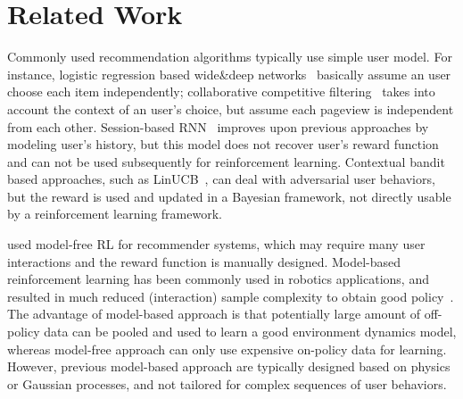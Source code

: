 \documentclass{article} %
\newcommand{\xc}[1]{{\color{blue}{\bf\sf [#1]}}}
\begin{document}


\vspace{-3mm}
\section{Related Work}
\vspace{-3mm}

Commonly used recommendation algorithms typically use simple user model. For instance, logistic regression based wide\&deep networks~\citep{ChengKocHarmsen16} basically assume an user choose each item independently; collaborative competitive filtering~\citep{YanLonSmoEtal11b} takes into account the context of an user's choice, but assume each pageview is independent from each other.
Session-based RNN~\citep{HidKarBalTik16} improves upon previous approaches by modeling user's history, but this model does not recover user's reward function and can not be used subsequently for reinforcement learning. Contextual bandit based approaches, such as LinUCB~\citep{LiChuLanSch10}, can deal with adversarial user behaviors, but the reward is used and updated in a Bayesian framework, not directly usable by a reinforcement learning framework.



\cite{XiangyuLiangZhuoye18,zhao2018deep,zheng2018drn} used model-free RL for recommender systems, which may require many user interactions and the reward function is manually designed. Model-based reinforcement learning has been commonly used in robotics applications, and resulted in much reduced (interaction) sample complexity to obtain good policy~\citep{DeisenrothFox15,NagabandiKahn17,IgnasiPieter18}. The advantage of model-based approach is that potentially large amount of off-policy data can be pooled and used to learn a good environment dynamics model, whereas model-free approach can only use expensive on-policy data for learning. However, previous model-based approach are typically designed based on physics or Gaussian processes, and not tailored for complex sequences of user behaviors.
\end{document}

